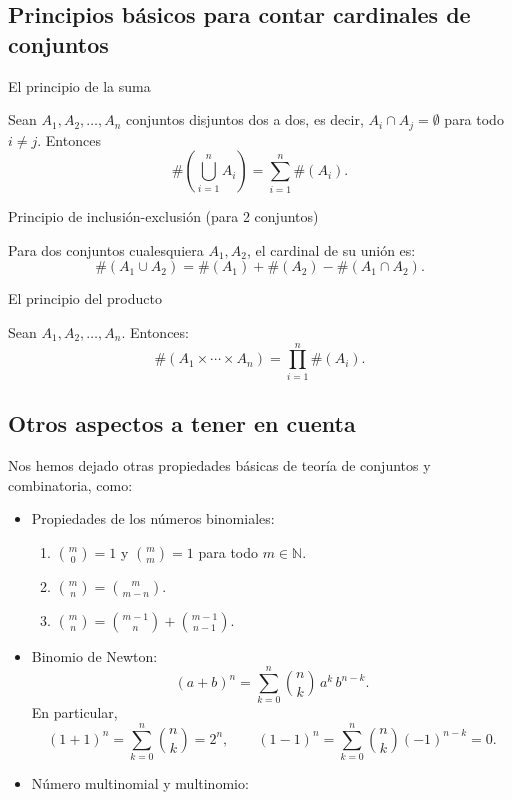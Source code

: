 \documentclass[
  letterpaper,
  DIV=11,
  numbers=noendperiod]{scrreprt}
\providecommand{\tightlist}{%
  \setlength{\itemsep}{0pt}\setlength{\parskip}{0pt}}\usepackage{longtable,booktabs,array}
\begin{document}
\subsection{Principios básicos para contar cardinales de
conjuntos}\label{principios-buxe1sicos-para-contar-cardinales-de-conjuntos}

\begin{Teorema}{El principio de la suma}{}

Sean \(A_1, A_2,\ldots, A_n\) conjuntos disjuntos dos a dos, es decir,
\(A_i\cap A_j=\emptyset\) para todo \(i\neq j\). Entonces \[
\#\left(\bigcup_{i=1}^n A_i\right)=\sum_{i=1}^n \#(A_i).
\]

\end{Teorema}

\begin{Teorema}{Principio de inclusión-exclusión (para 2 conjuntos)}{}

Para dos conjuntos cualesquiera \(A_1, A_2\), el cardinal de su unión
es: \[
\#(A_1\cup A_2)=\#(A_1)+\#(A_2)-\#(A_1\cap A_2).
\]

\end{Teorema}

\begin{Teorema}{El principio del producto}{}

Sean \(A_1,A_2,\ldots,A_n\). Entonces: \[
\#(A_1\times \cdots \times A_n)
=\prod_{i=1}^n \#(A_i).
\]

\end{Teorema}

\subsection{Otros aspectos a tener en
cuenta}\label{otros-aspectos-a-tener-en-cuenta}

Nos hemos dejado otras propiedades básicas de teoría de conjuntos y
combinatoria, como:

\begin{itemize}
\item
  Propiedades de los números binomiales:

  \begin{enumerate}
  \def\labelenumi{\arabic{enumi}.}
  \tightlist
  \item
    \(\binom{m}{0}=1\) y \(\binom{m}{m}=1\) para todo
    \(m\in \mathbb{N}\).
  \item
    \(\binom{m}{n}=\binom{m}{m-n}\).
  \item
    \(\binom{m}{n}=\binom{m-1}{n}+\binom{m-1}{n-1}\).
  \end{enumerate}
\item
  Binomio de Newton: \[
  (a+b)^n=\sum_{k=0}^n  \binom{n}{k}\, a^k\, b^{n-k}.
  \] En particular, \[
  (1+1)^n=\sum_{k=0}^n \binom{n}{k}=2^n,
  \qquad
  (1-1)^n=\sum_{k=0}^n \binom{n}{k}(-1)^{n-k}=0.
  \]
\item
  Número multinomial y multinomio:
\end{itemize}
\end{document}
